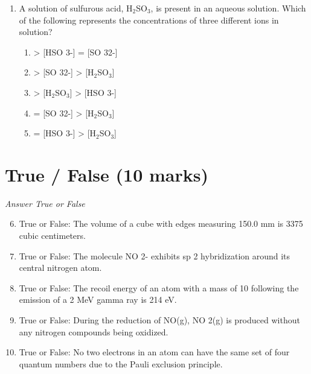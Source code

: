 \documentclass[12pt]{article}
\begin{document}
\begin{enumerate}[label=\arabic*.]
\begin{enumerate}[label=(\alph*)]
    \item Bond order of He\_2 is 0 and He\_2^+ is 0.5
    \item Bond order of He\_2 is 0.5 and He\_2^+ is 0
    \item Bond order of He\_2 and He\_2^+ is 0.5
    \item Bond order of He\_2 is 2 and He\_2^+ is 1.5
    \item Bond order of He\_2 is 1 and He\_2^+ is 0
\end{enumerate}
\item A solution of sulfurous acid, H$_{2}$SO$_{3}$, is present in an aqueous solution. Which of the following represents the concentrations of three different ions in solution?
\begin{enumerate}[label=(\alph*)]
    \item [H$_{2}$SO$_{3}$] \textgreater{} [HSO 3-] = [SO 32-]
    \item [HSO 3-] \textgreater{} [SO 32-] \textgreater{} [H$_{2}$SO$_{3}$]
    \item [SO 32-] \textgreater{} [H$_{2}$SO$_{3}$] \textgreater{} [HSO 3-]
    \item [HSO 3-] = [SO 32-] \textgreater{} [H$_{2}$SO$_{3}$]
    \item [SO 32-] = [HSO 3-] \textgreater{} [H$_{2}$SO$_{3}$]
\end{enumerate}
\end{enumerate}

\section*{True / False (10 marks)}
\textit{Answer True or False}
\begin{enumerate}[label=\arabic*.]
\setcounter{enumi}{5}
\item True or False: The volume of a cube with edges measuring 150.0 mm is 3375 cubic centimeters.
\item True or False: The molecule NO 2- exhibits sp 2 hybridization around its central nitrogen atom.
\item True or False: The recoil energy of an atom with a mass of 10 following the emission of a 2 MeV gamma ray is 214 eV.
\item True or False: During the reduction of NO(g), NO 2(g) is produced without any nitrogen compounds being oxidized.
\item True or False: No two electrons in an atom can have the same set of four quantum numbers due to the Pauli exclusion principle.
\end{enumerate}
\end{document}
